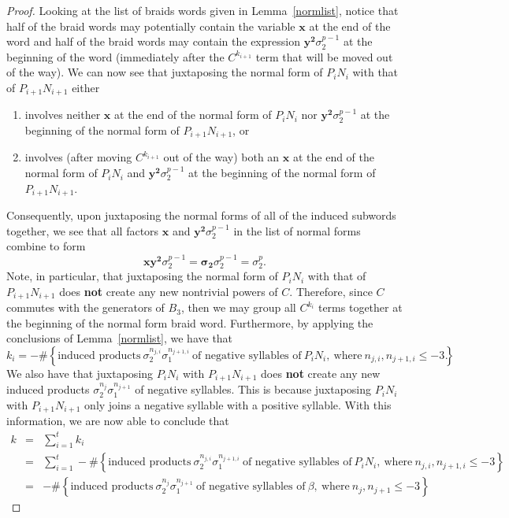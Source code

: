\documentclass{article}
\begin{document}
\begin{proof}
Looking at the list of braids words given in Lemma~\ref{normlist}, notice that half of the braid words may potentially contain the variable $\mathbf{x}$ at the end of the word and half of the braid words may contain the expression $\mathbf{y^{2}}\sigma_{2}^{p-1}$ at the beginning of the word (immediately after the $C^{k_{i+1}}$ term that will be moved out of the way). We can now see that juxtaposing the normal form of $P_{i}N_{i}$ with that of $P_{i+1}N_{i+1}$ either
\begin{enumerate}
	\item[(1)] involves neither $\mathbf{x}$ at the end of the normal form of $P_{i}N_{i}$ nor $\mathbf{y^{2}}\sigma_{2}^{p-1}$ at the beginning of the normal form of $P_{i+1}N_{i+1}$, or
	\item[(2)] involves (after moving $C^{k_{i+1}}$ out of the way) both an $\mathbf{x}$ at the end of the normal form of $P_{i}N_{i}$ and $\mathbf{y^{2}}\sigma_{2}^{p-1}$ at the beginning of the normal form of $P_{i+1}N_{i+1}$.
\end{enumerate}
\noindent Consequently, upon juxtaposing the normal forms of all of the induced subwords together, we see that all factors $\mathbf{x}$ and $\mathbf{y^{2}}\sigma_{2}^{p-1}$ in the list of normal forms combine to form $$\mathbf{xy^{2}}\sigma_{2}^{p-1}=\boldsymbol{\sigma_{2}}\sigma_{2}^{p-1}=\sigma_{2}^{p}.$$ 
Note, in particular, that juxtaposing the normal form of $P_{i}N_{i}$ with that of $P_{i+1}N_{i+1}$ does \textbf{not} create any new nontrivial powers of $C$.  Therefore, since $C$ commutes with the generators of $B_{3}$, then we may group all $C^{k_{i}}$ terms together at the beginning of the normal form braid word. Furthermore, by applying the conclusions of Lemma~\ref{normlist}, we have that 
$$k_{i}=-\# \left\{\text{induced\ products}\ \sigma_{2}^{n_{j,i}}\sigma_{1}^{n_{j+1,i}}\ \text{of\ negative\ syllables\ of}\ P_{i}N_{i},\ \text{where}\ n_{j,i}, n_{j+1,i} \leq -3 \right\}.$$
We also have that juxtaposing $P_{i}N_{i}$ with $P_{i+1}N_{i+1}$ does \textbf{not} create any new induced products $\sigma_{2}^{n_{j}}\sigma_{1}^{n_{j+1}}$ of negative syllables. This is because juxtaposing $P_{i}N_{i}$ with $P_{i+1}N_{i+1}$ only joins a negative syllable with a positive syllable. With this information, we are now able to conclude that
\begin{eqnarray*}
k & = & \sum_{i=1}^{t} k_{i}\\
\ & = & \sum_{i=1}^{t} -\# \left\{\text{induced\ products}\ \sigma_{2}^{n_{j,i}}\sigma_{1}^{n_{j+1,i}}\ \text{of\ negative\ syllables\ of}\ P_{i}N_{i},\ \text{where}\ n_{j,i}, n_{j+1,i} \leq -3 \right\}\\
\ & = & -\# \left\{\text{induced\ products}\ \sigma_{2}^{n_{j}}\sigma_{1}^{n_{j+1}}\ \text{of\ negative\ syllables\ of}\ \beta,\ \text{where}\ n_{j}, n_{j+1} \leq -3 \right\}.
\end{eqnarray*}          

\end{proof}
\end{document}
